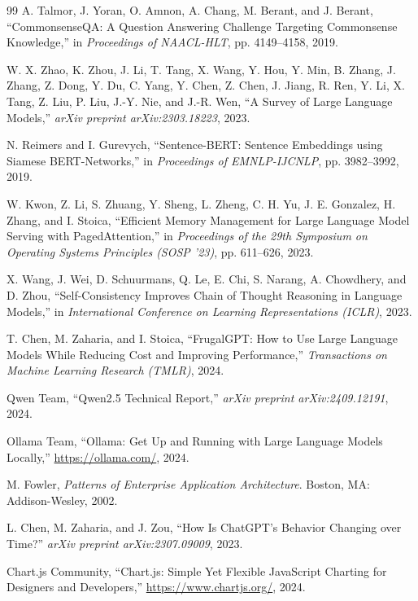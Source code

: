 \documentclass[12pt,a4paper]{report}
\begin{document}
\begin{thebibliography}{99}
 A. Talmor, J. Yoran, O. Amnon, A. Chang, M. Berant, and J. Berant, ``CommonsenseQA: A Question Answering Challenge Targeting Commonsense Knowledge,'' in \emph{Proceedings of NAACL-HLT}, pp. 4149--4158, 2019.

 W. X. Zhao, K. Zhou, J. Li, T. Tang, X. Wang, Y. Hou, Y. Min, B. Zhang, J. Zhang, Z. Dong, Y. Du, C. Yang, Y. Chen, Z. Chen, J. Jiang, R. Ren, Y. Li, X. Tang, Z. Liu, P. Liu, J.-Y. Nie, and J.-R. Wen, ``A Survey of Large Language Models,'' \emph{arXiv preprint arXiv:2303.18223}, 2023.

 N. Reimers and I. Gurevych, ``Sentence-BERT: Sentence Embeddings using Siamese BERT-Networks,'' in \emph{Proceedings of EMNLP-IJCNLP}, pp. 3982--3992, 2019.

 W. Kwon, Z. Li, S. Zhuang, Y. Sheng, L. Zheng, C. H. Yu, J. E. Gonzalez, H. Zhang, and I. Stoica, ``Efficient Memory Management for Large Language Model Serving with PagedAttention,'' in \emph{Proceedings of the 29th Symposium on Operating Systems Principles (SOSP '23)}, pp. 611--626, 2023.

 X. Wang, J. Wei, D. Schuurmans, Q. Le, E. Chi, S. Narang, A. Chowdhery, and D. Zhou, ``Self-Consistency Improves Chain of Thought Reasoning in Language Models,'' in \emph{International Conference on Learning Representations (ICLR)}, 2023.

 T. Chen, M. Zaharia, and I. Stoica, ``FrugalGPT: How to Use Large Language Models While Reducing Cost and Improving Performance,'' \emph{Transactions on Machine Learning Research (TMLR)}, 2024.

 Qwen Team, ``Qwen2.5 Technical Report,'' \emph{arXiv preprint arXiv:2409.12191}, 2024.

 Ollama Team, ``Ollama: Get Up and Running with Large Language Models Locally,'' \url{https://ollama.com/}, 2024.

 M. Fowler, \emph{Patterns of Enterprise Application Architecture}. Boston, MA: Addison-Wesley, 2002.

 L. Chen, M. Zaharia, and J. Zou, ``How Is ChatGPT's Behavior Changing over Time?'' \emph{arXiv preprint arXiv:2307.09009}, 2023.

 Chart.js Community, ``Chart.js: Simple Yet Flexible JavaScript Charting for Designers and Developers,'' \url{https://www.chartjs.org/}, 2024.

\end{thebibliography}
\end{document}
